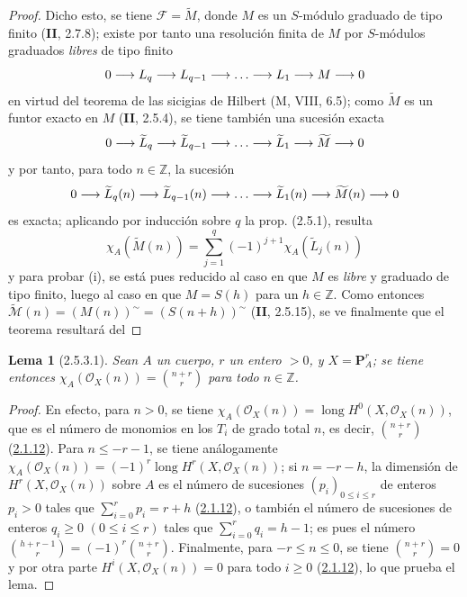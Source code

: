 \documentclass[10pt,oneside,openany]{book}
\theoremstyle{egaenv}\newtheorem*{env}{---}
\theoremstyle{egastatement}
\newtheorem*{lemma}{Lema}
\theoremstyle{egadescription}
\newcommand{\oldpage}[2][]{\marginnote{\normalfont\scriptsize\textbf{#1}\,|\,#2}\ignorespaces}
\renewcommand{\leq}{\leqslant}
\renewcommand{\geq}{\geqslant}
\renewcommand{\to}{\mathchoice{\longrightarrow}{\rightarrow}{\rightarrow}{\rightarrow}}
\begin{document}
\begin{proof}
Dicho esto, se tiene $\mathcal F=\widetilde M$, donde $M$ es un $S$-módulo
graduado de tipo finito (\textbf{II}, 2.7.8); existe por tanto una resolución finita
de $M$ por $S$-módulos graduados \emph{libres} de tipo finito
\[
0\to L_q\to L_{q-1}\to\ldots\to L_1\to M\to0
\]
en virtud del teorema de las sicigias de Hilbert (M, VIII, 6.5); como
$\widetilde M$ es un funtor exacto en $M$ (\textbf{II}, 2.5.4), se tiene
también una sucesión exacta
\[
0\to\widetilde L_q\to\widetilde L_{q-1}\to\ldots
\to\widetilde L_1\to\widetilde M\to0
\]
y por tanto, para todo $n\in\mathbb Z$, la sucesión
\[
0\to\widetilde L_q(n)\to\widetilde L_{q-1}(n)\to\ldots
\to\widetilde L_1(n)\to\widetilde M(n)\to0
\]
es exacta; aplicando por inducción sobre $q$ la prop. (2.5.1), resulta
\[
\chi_A(\widetilde M(n))=\sum_{j=1}^{q}(-1)^{j+1}
\chi_A(\widetilde L_j(n))
\]
y para probar (i), se está pues reducido al caso en que $M$ es \emph{libre} y graduado
de tipo finito, luego al caso en que $M=S(h)$ para un $h\in\mathbb Z$. Como
entonces $\widetilde{\mathcal M}(n)=(M(n))^\sim=(S(n+h))^\sim$ (\textbf{II}, 2.5.15), se ve
finalmente que el teorema resultará del
\end{proof}

\oldpage[III]{111}
\begin{lemma}[2.5.3.1]
\label{III.2.5.3.1-fr}
Sean $A$ un cuerpo, $r$ un entero $>0$, y $X=\mathbf P_A^r$; se tiene
entonces
$\chi_A(\mathcal O_X(n))=\binom{n+r}{r}$
para todo $n\in\mathbb Z$.
\end{lemma}

\begin{proof}
En efecto, para $n>0$, se tiene
$\chi_A(\mathcal O_X(n))=\operatorname{long}H^0(X,\mathcal O_X(n))$, que
es el número de monomios en los $T_i$ de grado total $n$, es decir,
$\binom{n+r}{r}$ (\hyperref[III.2.1.12-fr]{2.1.12}). Para
$n\leq-r-1$, se tiene análogamente
$\chi_A(\mathcal O_X(n))=(-1)^r
\operatorname{long}H^r(X,\mathcal O_X(n))$;
si $n=-r-h$, la dimensión de $H^r(X,\mathcal O_X(n))$ sobre $A$ es el
número de sucesiones $(p_i)_{0\leq i\leq r}$ de enteros $p_i>0$ tales que
$\sum_{i=0}^{r}p_i=r+h$ (\hyperref[III.2.1.12-fr]{2.1.12}), o también el
número de sucesiones de enteros $q_i\geq0$ $(0\leq i\leq r)$ tales que
$\sum_{i=0}^{r}q_i=h-1$; es pues el número
$\binom{h+r-1}{r}=(-1)^r\binom{n+r}{r}$.
Finalmente, para $-r\leq n\leq0$, se tiene $\binom{n+r}{r}=0$ y por otra parte
$H^i(X,\mathcal O_X(n))=0$ para todo $i\geq0$
(\hyperref[III.2.1.12-fr]{2.1.12}), lo que prueba el lema.
\end{proof}
\end{document}

